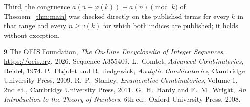 \documentclass[11pt,a4paper]{article}
\theoremstyle{plain}
\theoremstyle{definition}
\begin{document}
Third, the congruence $a(n+\varphi(k))\equiv a(n)\pmod k$ of Theorem~\ref{thm:main} was
checked directly on the published terms for every $k$ in that range and every $n\ge v(k)$
for which both indices are published; it holds without exception.

\begin{thebibliography}{9}
 The OEIS Foundation, \emph{The On-Line Encyclopedia of Integer
Sequences}, \url{https://oeis.org}, 2026. Sequence A355409.
 L.~Comtet, \emph{Advanced Combinatorics}, Reidel, 1974.
 P.~Flajolet and R.~Sedgewick, \emph{Analytic Combinatorics}, Cambridge
University Press, 2009.
 R.~P.~Stanley, \emph{Enumerative Combinatorics}, Volume 1, 2nd ed.,
Cambridge University Press, 2011.
 G.~H.~Hardy and E.~M.~Wright, \emph{An Introduction to the Theory of
Numbers}, 6th ed., Oxford University Press, 2008.
\end{thebibliography}
\end{document}

